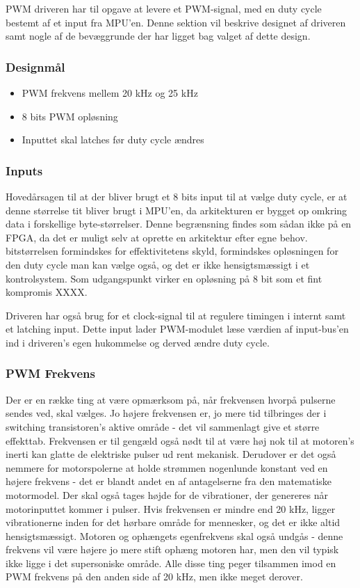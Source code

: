 PWM driveren har til opgave at levere et PWM-signal, med en duty cycle bestemt af et input fra MPU'en. Denne sektion vil beskrive designet af driveren samt nogle af de bevæggrunde der har ligget bag valget af dette design.

\subsubsection{Designmål}

\begin{itemize}[noitemsep]

\item PWM frekvens mellem 20 kHz og 25 kHz
\item 8 bits PWM opløsning
\item Inputtet skal latches før duty cycle ændres

\end{itemize}

\subsubsection{Inputs}

Hovedårsagen til at der bliver brugt et 8 bits input til at vælge duty cycle, er at denne størrelse tit bliver brugt i MPU'en, da arkitekturen er bygget op omkring data i forskellige byte-størrelser. Denne begrænsning findes som sådan ikke på en FPGA, da det er muligt selv at oprette en arkitektur efter egne behov. bitstørrelsen formindskes for effektivitetens skyld, formindskes opløsningen for den duty cycle man kan vælge også, og det er ikke hensigtsmæssigt i et kontrolsystem. Som udgangspunkt virker en opløsning på 8 bit som et fint kompromis XXXX.

Driveren har også brug for et clock-signal til at regulere timingen i internt samt et latching input. Dette input lader PWM-modulet læse værdien af input-bus'en ind i driveren's egen hukommelse og derved ændre duty cycle.

\subsubsection{PWM Frekvens}
Der er en række ting at være opmærksom på, når frekvensen hvorpå pulserne sendes ved, skal vælges. Jo højere frekvensen er, jo mere tid tilbringes der i switching transistoren's aktive område - det vil sammenlagt give et større effekttab. Frekvensen er til gengæld også nødt til at være høj nok til at motoren's inerti kan glatte de elektriske pulser ud rent mekanisk. Derudover er det også nemmere for motorspolerne at holde strømmen nogenlunde konstant ved en højere frekvens - det er blandt andet en af antagelserne fra den matematiske motormodel. Der skal også tages højde for de vibrationer, der genereres når motorinputtet kommer i pulser. Hvis frekvensen er mindre end 20 kHz, ligger vibrationerne inden for det hørbare område for mennesker, og det er ikke altid hensigtsmæssigt. Motoren og ophængets egenfrekvens skal også undgås - denne frekvens vil være højere jo mere stift ophæng motoren har, men den vil typisk ikke ligge i det supersoniske område. Alle disse ting peger tilsammen imod en PWM frekvens på den anden side af 20 kHz, men ikke meget derover. 

